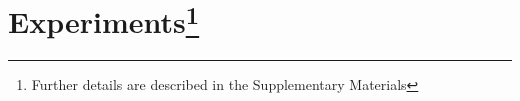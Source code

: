 \documentclass{article}
\begin{document}









\section{Experiments\footnote{Further details are described in the Supplementary Materials}}
\end{document}
